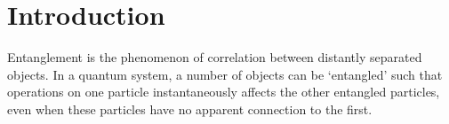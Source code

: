\section{Introduction}\label{sec:intro}

Entanglement is the phenomenon of correlation between distantly separated objects. In a quantum system, a number of objects can be `entangled' such that operations on one particle instantaneously affects the other entangled particles, even when these particles have no apparent connection to the first. 






